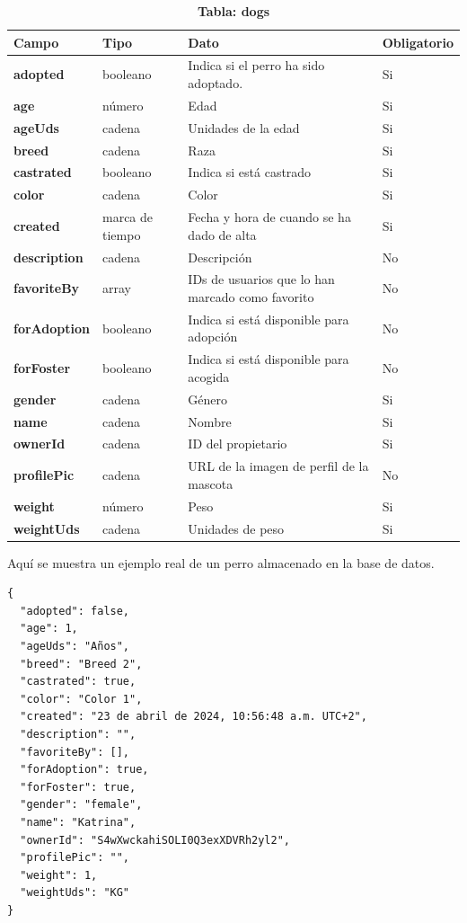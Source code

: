 \documentclass[a4paper, 12pt]{article}
\begin{document}
\begin{table}[H]
\captionsetup{justification=raggedright,singlelinecheck=false}
\caption{\textbf{Tabla: dogs}}
\label{tab:dogs}
	\begin{tabular}{|m{3cm}|m{2cm}|m{5cm}|m{3cm}|}
	\hline
	\textbf{Campo} & \textbf{Tipo} & \textbf{Dato} & \textbf{Obligatorio} \\ 
	\hline
	\textbf{adopted} & booleano & Indica si el perro ha sido adoptado. & Si \\ 
	\hline
	\textbf{age} & número & Edad & Si \\ 
	\hline
	\textbf{ageUds} & cadena & Unidades de la edad & Si \\ 
	\hline
	\textbf{breed} & cadena & Raza & Si \\ 
	\hline
	\textbf{castrated} & booleano & Indica si está castrado & Si \\ 
	\hline
	\textbf{color} & cadena & Color & Si \\ 
	\hline
	\textbf{created} & marca de tiempo & Fecha y hora de cuando se ha dado de alta & Si \\ 
	\hline
	\textbf{description} & cadena & Descripción & No \\ 
	\hline
	\textbf{favoriteBy} & array & IDs de usuarios que lo han marcado como favorito & No \\ 
	\hline
	\textbf{forAdoption} & booleano & Indica si está disponible para adopción & No \\ 
	\hline
	\textbf{forFoster} & booleano & Indica si está disponible para acogida & No \\ 
	\hline
	\textbf{gender} & cadena & Género & Si \\ 
	\hline
	\textbf{name} & cadena & Nombre & Si \\ 
	\hline
	\textbf{ownerId} & cadena & ID del propietario & Si \\ 
	\hline
	\textbf{profilePic} & cadena & URL de la imagen de perfil de la mascota & No \\ 
	\hline
	\textbf{weight} & número & Peso & Si \\ 
	\hline
	\textbf{weightUds} & cadena & Unidades de peso & Si \\ 
	\hline
\end{tabular}
\end{table}

Aquí se muestra un ejemplo real de un perro almacenado en la base de datos.

\begin{verbatim}
{
  "adopted": false,
  "age": 1,
  "ageUds": "Años",
  "breed": "Breed 2",
  "castrated": true,
  "color": "Color 1",
  "created": "23 de abril de 2024, 10:56:48 a.m. UTC+2",
  "description": "",
  "favoriteBy": [],
  "forAdoption": true,
  "forFoster": true,
  "gender": "female",
  "name": "Katrina",
  "ownerId": "S4wXwckahiSOLI0Q3exXDVRh2yl2",
  "profilePic": "",
  "weight": 1,
  "weightUds": "KG"
}
\end{verbatim}
\end{document}
